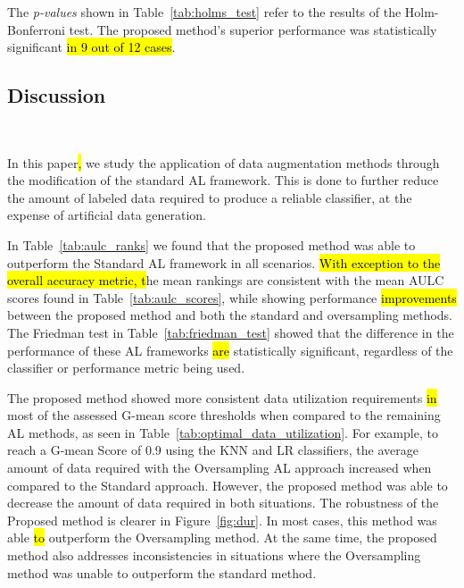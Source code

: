 \documentclass[preprint, 12pt]{elsarticle}
\begin{document}
The \textit{p-values} shown in Table~\ref{tab:holms_test} refer to the results
of the Holm-Bonferroni test. The proposed method's superior performance was
statistically significant \hl{in 9 out of 12 cases}. 

\begin{table}
	\centering
    \caption{%
        Adjusted p-values using the Holm-Bonferroni method. Bold values are
        statistically significant at a level of $\alpha = 0.05$. The null
        hypothesis is that the Oversampling or Proposed method does not
        perform better than the control method (Standard AL framework).
    }\label{tab:holms_test}
\end{table}

\subsection{Discussion}~\label{sec:sub_discussion}

In this paper\hl{,} we study the application of data augmentation methods
through the modification of the standard AL framework. This is done to further
reduce the amount of labeled data required to produce a reliable classifier,
at the expense of artificial data generation.
 
In Table~\ref{tab:aulc_ranks} we found that the proposed method was able to
outperform the Standard AL framework in all scenarios. \hl{With exception to
the overall accuracy metric, t}he mean rankings are consistent with the mean
AULC scores found in Table~\ref{tab:aulc_scores}, while showing performance
\hl{improvements} between the proposed method and both the standard and
oversampling methods. The Friedman test in Table~\ref{tab:friedman_test}
showed that the difference in the performance of these AL frameworks \hl{are}
statistically significant, regardless of the classifier or performance metric
being used.
 
The proposed method showed more consistent data utilization requirements
\hl{in} most of the assessed G-mean score thresholds when compared to the
remaining AL methods, as seen in Table~\ref{tab:optimal_data_utilization}. For
example, to reach a G-mean Score of 0.9 using the KNN and LR classifiers, the
average amount of data required with the Oversampling AL approach increased
when compared to the Standard approach. However, the proposed method was able
to decrease the amount of data required in both situations. The robustness of
the Proposed method is clearer in Figure~\ref{fig:dur}. In most cases, this
method was able \hl{to} outperform the Oversampling method. At the same time,
the proposed method also addresses inconsistencies in situations where the
Oversampling method was unable to outperform the standard method.
\end{document}
